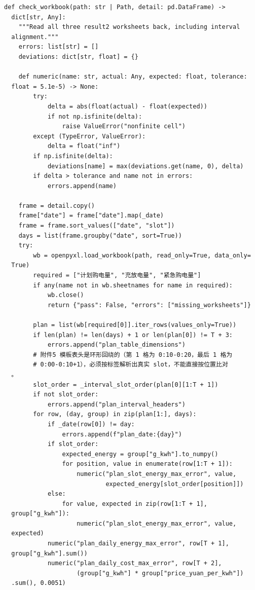 \begin{verbatim}
def check_workbook(path: str | Path, detail: pd.DataFrame) ->
  dict[str, Any]:
    """Read all three result2 worksheets back, including interval
  alignment."""
    errors: list[str] = []
    deviations: dict[str, float] = {}

    def numeric(name: str, actual: Any, expected: float, tolerance:
  float = 5.1e-5) -> None:
        try:
            delta = abs(float(actual) - float(expected))
            if not np.isfinite(delta):
                raise ValueError("nonfinite cell")
        except (TypeError, ValueError):
            delta = float("inf")
        if np.isfinite(delta):
            deviations[name] = max(deviations.get(name, 0), delta)
        if delta > tolerance and name not in errors:
            errors.append(name)

    frame = detail.copy()
    frame["date"] = frame["date"].map(_date)
    frame = frame.sort_values(["date", "slot"])
    days = list(frame.groupby("date", sort=True))
    try:
        wb = openpyxl.load_workbook(path, read_only=True, data_only=
  True)
        required = ["计划购电量", "充放电量", "紧急购电量"]
        if any(name not in wb.sheetnames for name in required):
            wb.close()
            return {"pass": False, "errors": ["missing_worksheets"]}

        plan = list(wb[required[0]].iter_rows(values_only=True))
        if len(plan) != len(days) + 1 or len(plan[0]) != T + 3:
            errors.append("plan_table_dimensions")
        # 附件5 模板表头是环形回绕的（第 1 格为 0:10-0:20，最后 1 格为
        # 0:00-0:10+1），必须按标签解析出真实 slot，不能直接按位置比对
  。
        slot_order = _interval_slot_order(plan[0][1:T + 1])
        if not slot_order:
            errors.append("plan_interval_headers")
        for row, (day, group) in zip(plan[1:], days):
            if _date(row[0]) != day:
                errors.append(f"plan_date:{day}")
            if slot_order:
                expected_energy = group["g_kwh"].to_numpy()
                for position, value in enumerate(row[1:T + 1]):
                    numeric("plan_slot_energy_max_error", value,
                            expected_energy[slot_order[position]])
            else:
                for value, expected in zip(row[1:T + 1],
  group["g_kwh"]):
                    numeric("plan_slot_energy_max_error", value,
  expected)
            numeric("plan_daily_energy_max_error", row[T + 1],
  group["g_kwh"].sum())
            numeric("plan_daily_cost_max_error", row[T + 2],
                    (group["g_kwh"] * group["price_yuan_per_kwh"])
  .sum(), 0.0051)


\end{verbatim}

